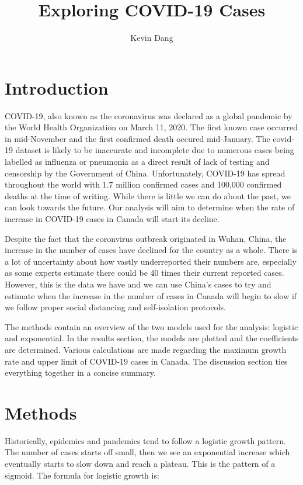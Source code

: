 \documentclass[12pt,a4paper]{article}
\author{Kevin Dang}
\title{Exploring COVID-19 Cases}
\begin{document}
\maketitle

\section*{Introduction}
COVID-19, also known as the coronavirus was declared as a global pandemic by the World Health Organization on March 11, 2020. The first known case occurred in mid-November and the first confirmed death occured mid-January. The covid-19 dataset is likely to be inaccurate and incomplete due to numerous cases being labelled as influenza or pneumonia as a direct result of lack of testing and censorship by the Government of China. Unfortunately, COVID-19 has spread throughout the world with 1.7 million confirmed cases and 100,000 confirmed deaths at the time of writing. While there is little we can do about the past, we can look towards the future. Our analysis will aim to determine when the rate of increase in COVID-19 cases in Canada will start its decline.

Despite the fact that the coronvirus outbreak originated in Wuhan, China, the increase in the number of cases have declined for the country as a whole. There is a lot of uncertainty about how vastly underreported their numbers are, especially as some experts estimate there could be 40 times their current reported cases. However, this is the data we have and we can use China's cases to try and estimate when the increase in the number of cases in Canada will begin to slow if we follow proper social distancing and self-isolation protocols.

The methods contain an overview of the two models used for the analysis: logistic and exponential. In the results section, the models are plotted and the coefficients are determined. Various calculations are made regarding the maximum growth rate and upper limit of COVID-19 cases in Canada. The discussion section ties everything together in a concise summary.

\section*{Methods}
Historically, epidemics and pandemics tend to follow a logistic growth pattern. The number of cases starts off small, then we see an exponential increase which eventually starts to slow down and reach a plateau. This is the pattern of a sigmoid. The formula for logistic growth is:
\end{document}

